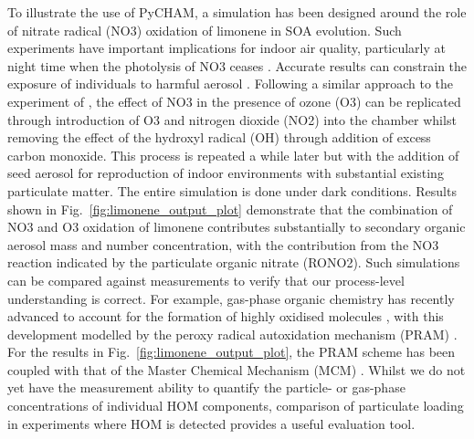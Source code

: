 \documentclass[gmd, manuscript]{copernicus}
\begin{document}
To illustrate the use of PyCHAM, a simulation has been designed around the role of nitrate radical (NO3) oxidation of limonene in SOA evolution.  Such experiments have important implications for indoor air quality, particularly at night time when the photolysis of NO3 ceases \citep{Waring2015}.  Accurate results can constrain the exposure of individuals to harmful aerosol \citep{Carslaw2019}.  Following a similar approach to the experiment of \citet{Fry2011}, the effect of NO3 in the presence of ozone (O3) can be replicated through introduction of O3 and nitrogen dioxide (NO2) into the chamber whilst removing the effect of the hydroxyl radical (OH) through addition of excess carbon monoxide.  This process is repeated a while later but with the addition of seed aerosol for reproduction of indoor environments with substantial existing particulate matter.  The entire simulation is done under dark conditions.  Results shown in Fig.~\ref{fig:limonene_output_plot} demonstrate that the combination of NO3 and O3 oxidation of limonene contributes substantially to secondary organic aerosol mass and number concentration, with the contribution from the NO3 reaction indicated by the particulate organic nitrate (RONO2).  Such simulations can be compared against measurements to verify that our process-level understanding is correct.  For example, gas-phase organic chemistry has recently advanced to account for the formation of highly oxidised molecules \citep{Ehn2014}, with this development modelled by the peroxy radical autoxidation mechanism (PRAM) \citep{Roldin2019}.  For the results in Fig.~\ref{fig:limonene_output_plot}, the PRAM scheme has been coupled with that of the Master Chemical Mechanism (MCM) \citep{Jenkin1997, Saunders2003}.  Whilst we do not yet have the measurement ability to quantify the particle- or gas-phase concentrations of individual HOM components, comparison of particulate loading in experiments where HOM is detected provides a useful evaluation tool.
\end{document}
